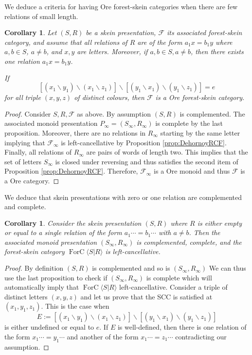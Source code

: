 \documentclass[a4paper, 12pt]{amsart}
\numberwithin{equation}{section}
\newtheorem{corollary}[theorem]{Corollary}
\theoremstyle{definition}
\newcommand{\bs}{\backslash}
\newcommand{\cF}{\mathcal F}
\DeclareMathOperator{\FC}{ForC}
\newcommand{\la}{\langle}
\newcommand{\ra}{\rangle}
\begin{document}
We deduce a criteria for having Ore forest-skein categories when there are few relations of small length.

\begin{corollary}\label{cor:Ore-FC}
Let $(S,R)$ be a skein presentation, $\cF$ its associated forest-skein category, and assume that all relations of $R$ are of the form $a_1x=b_1y$ where $a,b\in S$, $a\neq b$, and $x,y$ are letters. Moreover, if $a,b\in S, a\neq b$, then there exists one relation $a_1x=b_1y$. 

If $$[(x_1\bs y_1)\bs (x_1\bs z_1)]\bs [(y_1\bs x_1)\bs (y_1\bs z_1)]=e$$ for all triple $(x,y,z)$ of distinct colours, then $\cF$ is a Ore forest-skein category.
\end{corollary}

\begin{proof}
Consider $S,R,\cF$ as above.
By assumption $(S,R)$ is complemented. 
The associated monoid presentation $P_\infty=(S_\infty,R_\infty)$ is complete by the last proposition.
Moreover, there are no relations in $R_\infty$ starting by the same letter implying that $\cF_\infty$ is left-cancellative by Proposition \ref{prop:DehornoyRCF}.
Finally, all relations of $R_\infty$ are pairs of words of length two. This implies that the set of letters $S_\infty$ is closed under reversing and thus satisfies the second item of Proposition \ref{prop:DehornoyRCF}. 
Therefore, $\cF_\infty$ is a Ore monoid and thus $\cF$ is a Ore category.
\end{proof}

We deduce that skein presentations with zero or one relation are complemented and complete.

\begin{corollary}\label{cor:presentation-free}
Consider the skein presentation $(S,R)$ where $R$ is either empty or equal to a single relation of the form $a_1\cdots=b_1\cdots$ with $a\neq b$. 
Then the associated monoid presentation $(S_\infty,R_\infty)$ is complemented,  complete, and the forest-skein category $\FC\la S|R\ra$ is left-cancellative.
\end{corollary}

\begin{proof}
By definition $(S,R)$ is complemented and so is $(S_\infty,R_\infty)$
We can thus use the last proposition to check if $(S_\infty,R_\infty)$ is complete which will automatically imply that $\FC\la S|R\ra$ left-cancellative.
Consider a triple of distinct letters $(x,y,z)$ and let us prove that the SCC is satisfied at $(x_1,y_1,z_1)$.
This is the case when 
$$E:=[(x_1\bs y_1)\bs (x_1\bs z_1)]\bs [(y_1\bs x_1)\bs (y_1\bs z_1)]$$
is either undefined or equal to $e$.
If $E$ is well-defined, then there is one relation of the form $x_1\cdots=y_1\cdots$ and another of the form $x_1\cdots=z_1\cdots$ contradicting our assumption.
\end{proof}
\end{document}
